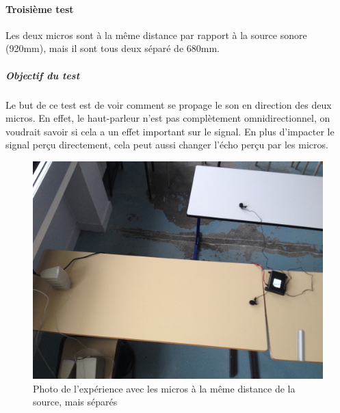 \documentclass[12pt,a4paper]{report}
\begin{document}
 \paragraph{Troisième test} 
 Les deux micros sont à la même distance par rapport à la source sonore (920mm), mais il sont tous deux séparé de 680mm.
 \subparagraph{Objectif du test}
 Le but de ce test est de voir comment se propage le son en direction des deux micros. En effet, le haut-parleur n'est pas complètement omnidirectionnel, on voudrait savoir si cela a un effet important sur le signal. En plus d'impacter le signal perçu directement, cela peut aussi changer l'écho perçu par les micros. 
 \begin{figure}[H]
 \includegraphics[width=\textwidth]{../tests/lecture_de_signaux_carres/donnees11-03/test_3.jpg} 
 \caption{Photo de l'expérience avec les micros à la même distance de la source, mais séparés}
 \end{figure}
 
\end{document}
